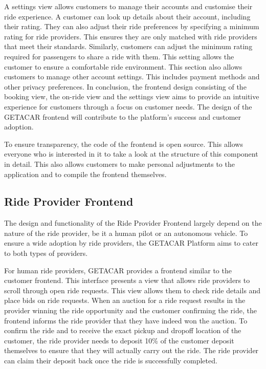 A settings view allows customers to manage their accounts and customise their ride experience. A customer can look up details about their account, including their rating. They can also adjust their ride preferences by specifying a minimum rating for ride providers. This ensures they are only matched with ride providers that meet their standards. Similarly, customers can adjust the minimum rating required for passengers to share a ride with them. This setting allows the customer to ensure a comfortable ride environment. This section also allows customers to manage other account settings. This includes payment methods and other privacy preferences. In conclusion, the frontend design consisting of the booking view, the on-ride view and the settings view aims to provide an intuitive experience for customers through a focus on customer needs. The design of the GETACAR frontend will contribute to the platform's success and customer adoption.

To ensure transparency, the code of the frontend is open source. This allows everyone who is interested in it to take a look at the structure of this component in detail. This also allows customers to make personal adjustments to the application and to compile the frontend themselves.

\subsection{Ride Provider Frontend}\label{subsec:RideProviderFrontend}
The design and functionality of the Ride Provider Frontend largely depend on the nature of the ride provider, be it a human pilot or an autonomous vehicle. To ensure a wide adoption by ride providers, the GETACAR Platform aims to cater to both types of providers.

For human ride providers, GETACAR provides a frontend similar to the customer frontend. This interface presents a view that allows ride providers to scroll through open ride requests. This view allows them to check ride details and place bids on ride requests. When an auction for a ride request results in the provider winning the ride opportunity and the customer confirming the ride, the frontend informs the ride provider that they have indeed won the auction. 
To confirm the ride and to receive the exact pickup and dropoff location of the customer, the ride provider needs to deposit 10\% of the customer deposit themselves to ensure that they will actually carry out the ride. The ride provider can claim their deposit back once the ride is successfully completed.

